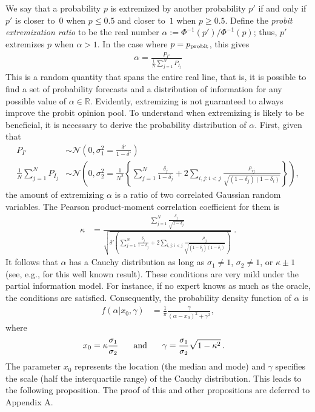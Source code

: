 \documentclass[11pt]{article}
\theoremstyle{definition}
\theoremstyle{definition}
\def\probit{p_{\rm probit}}
\begin{document}
We say that a probability $p$ is extremized by another probability $p'$ 
if and only if $p'$ is closer to~$0$ when $p \leq 0.5$ and closer 
to~$1$ when $p \geq 0.5$.  Define the {\em probit extremization ratio}
to be the real number $\alpha := \Phi^{-1}(p') / \Phi^{-1} (p)$; thus,
$p'$ extremizes $p$ when $\alpha > 1$.  In the case where $p = \probit$,
this gives
\begin{align}
\alpha  = \frac{P_{I'}}{\frac{1}{N}\sum_{j=1}^N P_{I_j}}\label{alpha}
\end{align}
%
This is a random quantity that spans the entire real line, that is, 
it is possible to find a set of probability forecasts and a distribution 
of information for any possible value of $\alpha \in \mathbb{R}$. 
Evidently, extremizing is not guaranteed to always improve the 
probit opinion pool.  
To understand when extremizing is likely to be beneficial, 
it is necessary to derive the probability distribution of $\alpha$. 
First, given that 
\begin{align*}
P_{I'} &\sim \mathcal{N}\left(0, \sigma^2_{1} = 
  \frac{\delta'}{1-\delta'} \right)\\ \frac{1}{N}\sum_{j=1}^N P_{I_j} 
&\sim \mathcal{N}\left(0, \sigma^2_{2} =\frac{1}{N^2} 
  \left\{ \sum_{j=1}^N \frac{\delta_j}{1-\delta_j} 
  + 2 \sum_{i,j: i<j} \frac{\rho_{ij}}{\sqrt{(1-\delta_j)(1-\delta_i)}}
  \right\} \right),
\end{align*}
the amount of extremizing $\alpha$ is a ratio of two correlated 
Gaussian random variables.  The Pearson product-moment correlation 
coefficient for them is
\begin{align*}
\kappa  &= 
  \frac{ \sum_{j=1}^N \frac{\delta_j}{\sqrt{1-\delta_j}}}
  {\sqrt{\delta'  \left( \sum_{j=1}^N \frac{\delta_j}{1-\delta_j} + 2 
  \sum_{i,j: i<j} \frac{\rho_{ij}}{\sqrt{(1-\delta_j)(1-\delta_i)}}\right)}}
  \; .
\end{align*}
It follows that $\alpha$ has a Cauchy distribution as long as 
$\sigma_1 \neq 1$, $\sigma_2 \neq 1$, or $\kappa \pm 1$ 
(see, e.g., \citealt{cedilnik2004distribution} for this 
well known result).  These conditions are very mild under 
the partial information model.  For instance, if no expert 
knows as much as the oracle, the conditions are satisfied. 
Consequently, the probability density function of $\alpha$ is
\begin{align*}
f(\alpha | x_0, \gamma) &= \frac{1}{\pi} 
  \frac{\gamma}{(\alpha-x_0)^2+\gamma^2}, 
\end{align*}
where 
\begin{align*}
x_0 = \kappa \frac{\sigma_1}{\sigma_2} \hspace{0.2in} \mbox{ and } 
  \hspace{0.2in} \gamma &= \frac{\sigma_1}{\sigma_2} \sqrt{1-\kappa^2} \, .
\end{align*}
The parameter $x_0$ represents the location (the median and mode) and 
$\gamma$ specifies the scale (half the interquartile range) of the 
Cauchy distribution. This leads to the following proposition. 
The proof of this and other propositions are deferred to Appendix A.
\end{document}
